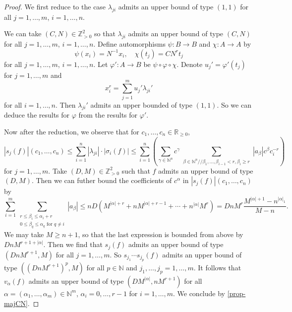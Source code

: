 \begin{proof}
    We first reduce to the case $\lambda_{ji}$ admits an upper bound of type $(1,1)$ for all $j=1,\ldots,m$, $i=1,\ldots,n$. 
    
    We can take $(C,N)\in \mathbb{Z}_{>0}^2$ so that $\lambda_{ji}$ admits an upper bound of type $(C,N)$  for all $j=1,\ldots,m$, $i=1,\ldots,n$. Define automorphisms $\psi:B\rightarrow B$ and $\chi:A\rightarrow A$ by
    \[
        \psi(x_i)=N^{-1}x_i,\quad \chi(t_j)=CN^rt_j  
    \]
    for all $j=1,\ldots,m$, $i=1,\ldots,n$. 
    Let $\varphi':A\rightarrow B$ be $\psi\circ \varphi\circ \chi$. Denote $u_j'=\varphi'(t_j)$ for $j=1,\ldots,m$ and
    \[
        x_i^r=\sum_{j=1}^m u_j' \lambda_{ji}'  
    \]
    for all $i=1,\ldots,n$. Then $\lambda_{ji}'$ admits an upper bounded of type $(1,1)$. So we can deduce the results for $\varphi$ from the results for $\varphi'$.

    Now after the reduction, we observe that for $c_1,\ldots,c_n\in \mathbb{R}_{\geq 0}$,
    \[
        |s_j(f)|(c_1,\ldots,c_n)\leq \sum_{i=1}^n |\lambda_{ji}|\cdot |\sigma_i(f)| \leq \sum_{i=1}^n \left(\sum_{\gamma \in \mathbb{N}^n} c^{\gamma} \sum_{\substack{\beta\in \mathbb{N}^n// \beta_1,\ldots,\beta_{i-1}<r,\beta_i\geq r}} |a_{\beta}| c^{\beta} c_i^{-r}\right)
    \]
    for $j=1,\ldots,m$.
    Take $(D,M)\in \mathbb{Z}_{>0}^2$ such that $f$ admits an upper bound of type $(D,M)$. Then we can futher bound the coefficients of $c^{\alpha}$ in $|s_j(f)|(c_1,\ldots,c_n)$ by
    \[
        \sum_{i=1}^m \sum_{\substack{r\leq \beta_i\leq \alpha_i+r\\ 0\leq \beta_q\leq \alpha_q\text{ for }q\neq i}}|a_{\beta}|\leq  nD\left(M^{|\alpha|+r}+n M^{|\alpha|+r-1} +\cdots+ n^{|\alpha|}M^r\right)=DnM^r \frac{M^{|\alpha|+1}-n^{|\alpha|_1}}{M-n}.
    \]
    We may take $M\geq n+1$, so that the last expression is bounded from above by $Dn M^{r+1+|\alpha|}$. Then we find that $s_j(f)$ admits an upper bound of type $(DnM^{r+1},M)$ for all $j=1,\ldots,m$. So $s_{j_1}\cdots s_{j_p}(f)$ admits an upper bound of type  $((DnM^{r+1})^p,M)$ for all $p\in \mathbb{N}$ and $j_1,\ldots,j_p=1,\ldots,m$. It follows that $v_{\alpha}(f)$ admits an upper bound of type $(DM^{|\alpha|},nM^{r+1})$ for all $\alpha=(\alpha_1,\ldots,\alpha_m)\in \mathbb{N}^{m}$, $\alpha_i=0,\ldots,r-1$ for $i=1,\ldots,m$. We conclude by \cref{prop-majCN}.

\end{proof}

